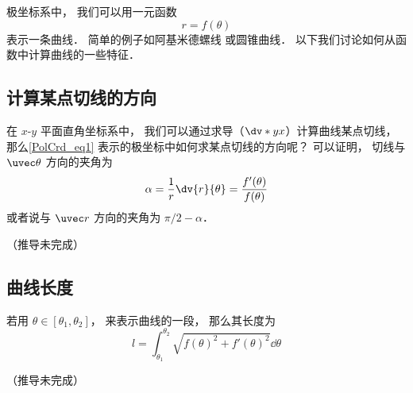 

极坐标系中， 我们可以用一元函数
\begin{equation}\label{PolCrd_eq1}
r = f(\theta)
\end{equation}
表示一条曲线． 简单的例子如阿基米德螺线 或圆锥曲线． 以下我们讨论如何从函数中计算曲线的一些特征．

\subsection{计算某点切线的方向}


在 $x$-$y$ 平面直角坐标系中， 我们可以通过求导（$\dv*{y}{x}$）计算曲线某点切线， 那么\autoref{PolCrd_eq1} 表示的极坐标中如何求某点切线的方向呢？ 可以证明， 切线与 $\uvec\theta$ 方向的夹角为
\begin{equation}
\alpha = \frac{1}{r} \dv{r}{\theta} = \frac{f'(\theta)}{f(\theta)}
\end{equation}
或者说与 $\uvec r$ 方向的夹角为 $\pi/2 - \alpha$．

（推导未完成）

\subsection{曲线长度}

若用 $\theta \in [\theta_1, \theta_2]$， 来表示曲线的一段， 那么其长度为
\begin{equation}
l = \int_{\theta_1}^{\theta_2} \sqrt{f(\theta)^2 + f'(\theta)^2} \dd{\theta}
\end{equation}

（推导未完成）

